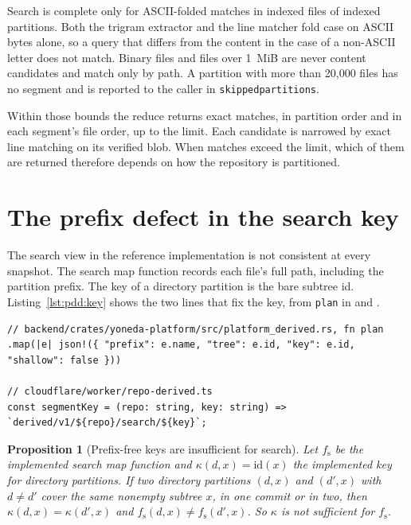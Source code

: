 \documentclass[11pt,letterpaper]{article}
\newtheorem{proposition}[theorem]{Proposition}
\theoremstyle{definition}
\theoremstyle{remark}
\newcommand{\id}{\mathrm{id}}
\DeclareRobustCommand{\code}[1]{{\def\_{\textunderscore\allowbreak}\texttt{#1}}}
\begin{document}
Search is complete only for ASCII-folded matches in indexed files of indexed partitions. Both the trigram extractor and the line matcher fold case on ASCII bytes alone, so a query that differs from the content in the case of a non-ASCII letter does not match. Binary files and files over 1~MiB are never content candidates and match only by path. A partition with more than 20,000 files has no segment and is reported to the caller in \code{skipped\_partitions}.

Within those bounds the reduce returns exact matches, in partition order and in each segment's file order, up to the limit. Each candidate is narrowed by exact line matching on its verified blob. When matches exceed the limit, which of them are returned therefore depends on how the repository is partitioned.

\section{The prefix defect in the search key}
\label{sec:pdd:prefix}

The search view in the reference implementation is not consistent at every snapshot. The search map function records each file's full path, including the partition prefix. The key of a directory partition is the bare subtree id. Listing~\ref{lst:pdd:key} shows the two lines that fix the key, from \code{plan} in  and .

\begin{lstlisting}[caption={The partition key in the plan (Rust) and the storage key (TypeScript) at commit \code{cfa4845}.},label={lst:pdd:key}]
// backend/crates/yoneda-platform/src/platform_derived.rs, fn plan
.map(|e| json!({ "prefix": e.name, "tree": e.id, "key": e.id, "shallow": false }))

// cloudflare/worker/repo-derived.ts
const segmentKey = (repo: string, key: string) => `derived/v1/${repo}/search/${key}`;
\end{lstlisting}

\begin{proposition}[Prefix-free keys are insufficient for search]
\label{prop:pdd:prefix}
Let $f_{\mathrm{s}}$ be the implemented search map function and $\kappa(d,x)=\id(x)$ the implemented key for directory partitions. If two directory partitions $(d,x)$ and $(d',x)$ with $d\ne d'$ cover the same nonempty subtree $x$, in one commit or in two, then $\kappa(d,x)=\kappa(d',x)$ and $f_{\mathrm{s}}(d,x)\ne f_{\mathrm{s}}(d',x)$. So $\kappa$ is not sufficient for $f_{\mathrm{s}}$.
\end{proposition}
\end{document}
